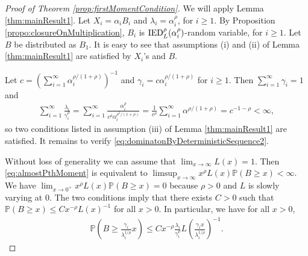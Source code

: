 \documentclass[bj]{imsart}
\numberwithin{equation}{section}
\renewcommand{\P}{\mathbb{P}}
\newcommand{\IED}{{\rm IED}}
\newcommand{\1}{\mathbf{1}}
\theoremstyle{definition}
\begin{document}
\begin{proof}[Proof of Theorem \ref{prop:firstMomentCondition}]

We will apply Lemma \ref{thm:mainResult1}. Let $X_i = \alpha_iB_i$ and $\lambda_i = \alpha_i^\rho$, for $i\geq 1$. By Proposition \ref{propo:closureOnMultiplication}, $B_i$ is
$\IED^\rho_L(\alpha_i^\rho )$-random variable, for $i\geq 1$. Let $B$ be  distributed as $B_1$. It is easy to see that assumptions (i) and (ii) 
of Lemma \ref{thm:mainResult1} are satisfied by $X_i$'s and $B$.

Let $c=\left(\sum_{i=1}^{\infty}\alpha_i^{\rho/(1+\rho)}\right)^{-1}$ 
and $\gamma_i=c\alpha_i^{\rho/(1+\rho)}$ for $i\geq 1$. 
Then $\sum_{i=1}^{\infty}\gamma_i=1$ and 
\begin{align}\label{o30.3}
\sum_{i=1}^{\infty}\frac{\lambda_i}{\gamma_i^\rho}=\sum_{i=1}^\infty\frac{\alpha_i^{\rho}}{c^\rho \alpha_i^{\rho^2/(1+\rho)}}=\frac{1}{c^\rho}\sum_{i=1}^\infty \alpha^{\rho/(1+\rho)}= c^{-1-\rho}<\infty,
\end{align}
so two conditions listed in assumption (iii) of Lemma \ref{thm:mainResult1} are satisfied. 
It remains to verify 
\eqref{eq:dominatonByDeterministicSequence2}.

Without loss of generality we can assume  that
$\lim_{x\to \infty}L(x)=1$. Then  \eqref{eq:almostPthMoment} is equivalent to $\limsup_{x\to \infty}x^\rho L(x) \P(B\geq x)<\infty$.
We have  $\lim_{x\to 0^+}x^\rho L(x) \P(B\geq x)=0$
because $\rho >0$ and $L$ is slowly varying at 0.
The two conditions imply that there exists $C>0$ such that $\P(B\geq x) \leq C x^{-\rho} L(x)^{-1}$ for all $x>0$. In particular, we have for all $x>0$,
\begin{align}\label{n22.1}
\P\left(B\geq \frac{\gamma_i}{\lambda_i^{1/\rho}}x\right)\leq C x^{-\rho}\frac{\lambda_i}{\gamma_i^\rho}L\left(\frac{\gamma_ix}{\lambda_i^{1/\rho}}
\right)^{-1}.
\end{align}


\end{proof}
\end{document}
